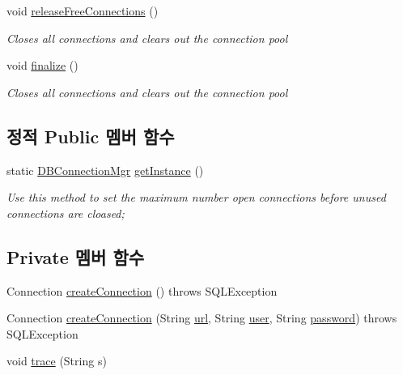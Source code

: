 \begin{DoxyCompactItemize}
void \mbox{\hyperlink{classcom_1_1github_1_1aites_1_1framework_1_1globalknowledge_1_1_d_b_connection_mgr_a67f3de21da7af6a9bae587a38eb18cb3}{release\+Free\+Connections}} ()
\begin{DoxyCompactList}\small\item\em Closes all connections and clears out the connection pool \end{DoxyCompactList}\item 
void \mbox{\hyperlink{classcom_1_1github_1_1aites_1_1framework_1_1globalknowledge_1_1_d_b_connection_mgr_adda5635c9ebbf05bd57b300d7523eaaf}{finalize}} ()
\begin{DoxyCompactList}\small\item\em Closes all connections and clears out the connection pool \end{DoxyCompactList}\end{DoxyCompactItemize}
\subsection*{정적 Public 멤버 함수}
\begin{DoxyCompactItemize}
\item 
static \mbox{\hyperlink{classcom_1_1github_1_1aites_1_1framework_1_1globalknowledge_1_1_d_b_connection_mgr}{D\+B\+Connection\+Mgr}} \mbox{\hyperlink{classcom_1_1github_1_1aites_1_1framework_1_1globalknowledge_1_1_d_b_connection_mgr_a67ce18035fff4da872e8aec1a1367d11}{get\+Instance}} ()
\begin{DoxyCompactList}\small\item\em Use this method to set the maximum number open connections before unused connections are cloased; \end{DoxyCompactList}\end{DoxyCompactItemize}
\subsection*{Private 멤버 함수}
\begin{DoxyCompactItemize}
\item 
Connection \mbox{\hyperlink{classcom_1_1github_1_1aites_1_1framework_1_1globalknowledge_1_1_d_b_connection_mgr_a5000396759d53cd8e80b9951cdf6fda9}{create\+Connection}} ()  throws S\+Q\+L\+Exception
\item 
Connection \mbox{\hyperlink{classcom_1_1github_1_1aites_1_1framework_1_1globalknowledge_1_1_d_b_connection_mgr_a889778e8e7802cc0d7bdc47ee82d237d}{create\+Connection}} (String \mbox{\hyperlink{classcom_1_1github_1_1aites_1_1framework_1_1globalknowledge_1_1_d_b_connection_mgr_a86e734da035245fae5ee3a77ba92d7a9}{url}}, String \mbox{\hyperlink{classcom_1_1github_1_1aites_1_1framework_1_1globalknowledge_1_1_d_b_connection_mgr_a23c20259e7ddd8b5d7d82aff18db1034}{user}}, String \mbox{\hyperlink{classcom_1_1github_1_1aites_1_1framework_1_1globalknowledge_1_1_d_b_connection_mgr_a0c6550844ff29a2f303d7ca3f059d535}{password}})  throws S\+Q\+L\+Exception
\item 
void \mbox{\hyperlink{classcom_1_1github_1_1aites_1_1framework_1_1globalknowledge_1_1_d_b_connection_mgr_ae9ff677183d99acafb2da9cd8ba6de20}{trace}} (String s)
\end{DoxyCompactItemize}
